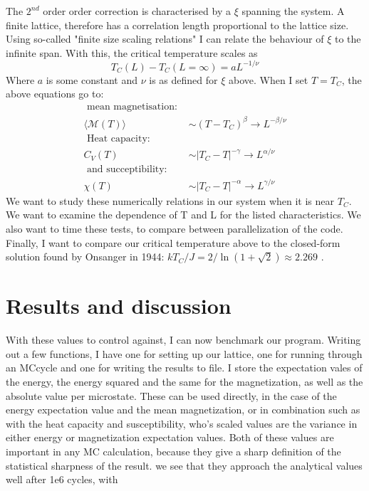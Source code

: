 \documentclass[10pt, twocolumn]{revtex4-1}
\begin{document}
The $2^{nd}$ order order correction is characterised by a $\xi$ spanning the system. A finite lattice, therefore has a correlation length proportional to
the lattice size. Using so-called "finite size scaling relations" I can relate the behaviour of $\xi$ to the infinite span. With this, the critical
temperature scales as
\[ T _ { C } ( L ) - T _ { C } ( L = \infty ) = a L ^ { - 1 / \nu } \]
Where $a$ is some constant and $\nu$ is as defined for $\xi$ above. When I set $T = T_C$, the above equations go to:
\begin{align*}
    \text{ mean magnetisation: } \\
    \langle \mathcal { M } ( T ) \rangle &\sim \left( T - T _ { C } \right) ^ { \beta } \rightarrow L ^ { - \beta / \nu }\\
    \text{ Heat capacity: } \\
    C _ { V } ( T ) &\sim \left| T _ { C } - T \right| ^ { - \gamma } \rightarrow L ^ { \alpha / \nu }\\
    \text{ and succeptibility: } \\
    \chi ( T ) &\sim \left| T _ { C } - T \right| ^ { - \alpha } \rightarrow L ^ { \gamma / \nu }
\end{align*}
We want to study these numerically relations in our system when it is near $T_C$. We want to examine the dependence of T and L for the listed characteristics.
We also want to time these tests, to compare between parallelization of the code. Finally, I want to compare our critical temperature above to the
closed-form solution found by Onsanger in 1944: $k T _ { C } / J = 2 / \ln ( 1 + \sqrt { 2 } ) \approx 2.269$ \cite{PhysRev.65.117}.


\section{Results and discussion}

With these values to control against, I can now benchmark our program. Writing out a few functions, I have one for setting up our lattice, one for running
through an MCcycle and one for writing the results to file. I store the expectation vales of the energy, the energy squared and the same for the magnetization,
as well as the absolute value per microstate. These can be used directly, in the case of the energy expectation value and the mean magnetization, or in
combination such as with the heat capacity and susceptibility, who's scaled values are the variance in either energy or magnetization expectation values. Both
of these values are important in any MC calculation, because they give a sharp definition of the statistical sharpness of the result.
we see that they approach the analytical values well after 1e6 cycles, with %
\end{document}
